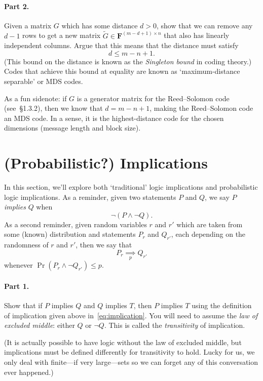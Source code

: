 \documentclass[12pt,hidelinks]{article}
\newcommand{\field}{\mathbf{F}}
\newcommand{\impliesn}[1]{\underset{#1}{\implies}}
\newcommand{\impliesp}{\impliesn{p}}
\begin{document}
\paragraph{Part 2.} Given a matrix $G$ which has some distance $d > 0$, show
that we can remove any $d-1$ rows to get a new matrix $\tilde G \in
\field^{(m-d + 1)\times n}$ that also has linearly independent columns. Argue
that this means that the distance must satisfy
\[
    d \le m - n + 1.
\]
(This bound on the distance is known as the \emph{Singleton bound} in coding
theory.) Codes that achieve this bound at equality are known as
`maximum-distance separable' or MDS codes.

As a fun sidenote: if $G$ is a generator matrix for the Reed--Solomon code
(see~\S1.3.2), then we know that $d = m - n + 1$, making the Reed--Solomon code
an MDS code. In a sense, it is the highest-distance code for the chosen
dimensions (message length and block size).

\section{(Probabilistic?) Implications}
In this section, we'll explore both `traditional' logic implications
and probabilistic logic implications. As a reminder, given two statements
$P$ and $Q$, we say $P$ \emph{implies} $Q$ when
\begin{equation}\label{eq:implication}
    \neg(P \wedge \neg Q).
\end{equation}
As a second reminder, given random variables $r$ and $r'$ which are taken
from some (known) distribution and statements $P_r$ and $Q_{r'}$, each
depending on the randomness of $r$ and $r'$, then we say that
\[
    P_r \impliesp Q_{r'}
\]
whenever $\Pr(P_r \wedge \neg Q_{r'}) \le p$.


\paragraph{Part 1.} Show that if $P$ implies $Q$ and $Q$ implies $T$, then $P$
implies $T$ using the definition of implication given
above in~\eqref{eq:implication}. You will need to assume the \emph{law of
excluded middle}: either $Q$ or $\neg Q$. This is called the \emph{transitivity}
of implication.

(It is actually possible to have logic without the law of excluded middle, but
implications must be defined differently for transitivity to hold. Lucky for
us, we only deal with finite---if very large---sets so we can forget any of
this conversation ever happened.)
\end{document}
